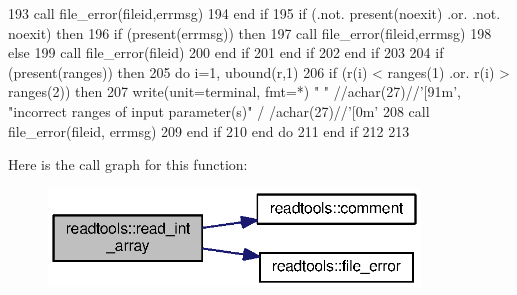 \begin{DoxyCode}
193           \textcolor{keyword}{call }file_error(fileid,errmsg)
194 \textcolor{keywordflow}{        end if}
195         \textcolor{keywordflow}{if} (.not. \textcolor{keyword}{present}(noexit) .or. .not. noexit) \textcolor{keywordflow}{then}
196           \textcolor{keywordflow}{if} (\textcolor{keyword}{present}(errmsg)) \textcolor{keywordflow}{then}
197             \textcolor{keyword}{call }file_error(fileid,errmsg)
198           \textcolor{keywordflow}{else}
199             \textcolor{keyword}{call }file_error(fileid)
200 \textcolor{keywordflow}{          end if}
201 \textcolor{keywordflow}{        end if}
202 \textcolor{keywordflow}{      end if}
203       
204       \textcolor{keywordflow}{if} (\textcolor{keyword}{present}(ranges)) \textcolor{keywordflow}{then}
205         \textcolor{keywordflow}{do} i=1, ubound(r,1)
206           \textcolor{keywordflow}{if} (r(i) < ranges(1) .or. r(i) > ranges(2)) \textcolor{keywordflow}{then}
207             \textcolor{keyword}{write}(unit=terminal, fmt=*) \textcolor{stringliteral}{" "} //achar(27)//\textcolor{stringliteral}{'[91m'}, \textcolor{stringliteral}{"incorrect ranges of input parameter(s)"}\textcolor{comment}{ /
      /achar(27)//}\textcolor{stringliteral}{'[0m'}
208             \textcolor{keyword}{call }file_error(fileid, errmsg)
209 \textcolor{keywordflow}{          end if}
210 \textcolor{keywordflow}{        end do}
211 \textcolor{keywordflow}{      end if}
212       
213       
\end{DoxyCode}


Here is the call graph for this function\+:\nopagebreak
\begin{figure}[H]
\begin{center}
\leavevmode
\includegraphics[width=280pt]{namespacereadtools_a988d0a7b5d8e2f02f0c7249f640c5984_cgraph}
\end{center}
\end{figure}


